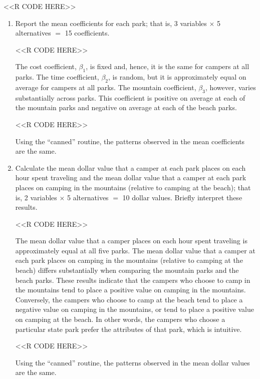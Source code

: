 \documentclass[11pt,letterpaper]{article}
\begin{document}
\begin{enumerate}[label=\alph*., leftmargin=*]
	<<R CODE HERE>>

	\begin{enumerate}[label=\roman*.]
		\item Report the mean coefficients for each park; that is, 3 variables $\times$ 5 alternatives $=$ 15 coefficients.

		<<R CODE HERE>>

		The cost coefficient, $\beta_1$, is fixed and, hence, it is the same for campers at all parks. The time coefficient, $\beta_2$, is random, but it is approximately equal on average for campers at all parks. The mountain coefficient, $\beta_3$, however, varies substantially across parks. This coefficient is positive on average at each of the mountain parks and negative on average at each of the beach parks.

		<<R CODE HERE>>

		Using the ``canned'' routine, the patterns observed in the mean coefficients are the same.

		\item Calculate the mean dollar value that a camper at each park places on each hour spent traveling and the mean dollar value that a camper at each park places on camping in the mountains (relative to camping at the beach); that is, 2 variables $\times$ 5 alternatives $=$ 10 dollar values. Briefly interpret these results.

		<<R CODE HERE>>

		The mean dollar value that a camper places on each hour spent traveling is approximately equal at all five parks. The mean dollar value that a camper at each park places on camping in the mountains (relative to camping at the beach) differs substantially when comparing the mountain parks and the beach parks. These results indicate that the campers who choose to camp in the mountains tend to place a positive value on camping in the mountains. Conversely, the campers who choose to camp at the beach tend to place a negative value on camping in the mountains, or tend to place a positive value on camping at the beach. In other words, the campers who choose a particular state park prefer the attributes of that park, which is intuitive.

		<<R CODE HERE>>

		Using the ``canned'' routine, the patterns observed in the mean dollar values are the same.
	\end{enumerate}
\end{enumerate}
\end{document}
